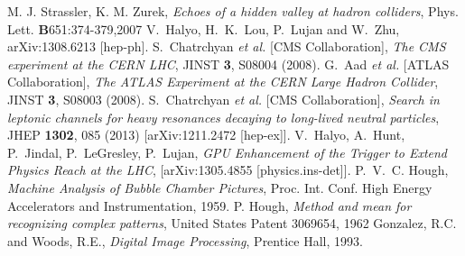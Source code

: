 \documentclass{JINST}
\begin{document}
\begin{thebibliography}{9}
%
%
M. J. Strassler, K. M. Zurek, 
\emph{Echoes of a hidden valley at hadron colliders},
Phys. Lett. \textbf{B}651:374-379,2007 
%
%
  V.~Halyo, H.~K.~Lou, P.~Lujan and W.~Zhu,
  arXiv:1308.6213 [hep-ph].
%
%
  S.~Chatrchyan {\it et al.}  [CMS Collaboration],
\emph{The CMS experiment at the CERN LHC},
  JINST {\bf 3}, S08004 (2008).
%
%
  G.~Aad {\it et al.}  [ATLAS Collaboration],
\emph{The ATLAS Experiment at the CERN Large Hadron Collider},
  JINST {\bf 3}, S08003 (2008).
%
%
  S.~Chatrchyan {\it et al.}  [CMS Collaboration],
  \emph{Search in leptonic channels for heavy resonances decaying to long-lived neutral particles},
  JHEP {\bf 1302}, 085 (2013)
  [arXiv:1211.2472 [hep-ex]].
%
%
V.~Halyo, A.~Hunt, P.~Jindal, P.~LeGresley, P.~Lujan,
\emph{GPU Enhancement of the Trigger to Extend Physics Reach at the LHC},
[arXiv:1305.4855 [physics.ins-det]].
%
%
%
P.~V.~C. Hough, 
\emph{Machine Analysis of Bubble Chamber Pictures}, 
Proc. Int. Conf. High Energy Accelerators and Instrumentation, 1959.
%
%
 P. Hough,
\emph{Method and mean for recognizing complex patterns}, 
United States Patent 3069654, 1962
%
%
 Gonzalez, R.C. and Woods, R.E., 
\emph{Digital Image Processing},
Prentice Hall, 1993.
%
%
\end{thebibliography}
\end{document}
